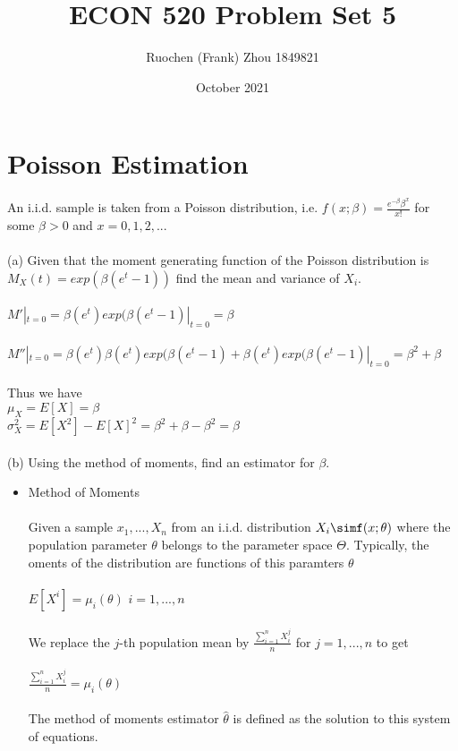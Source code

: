 \documentclass{article}
\title{ECON 520 Problem Set 5}
\author{Ruochen (Frank) Zhou 1849821}
\date{October 2021}
\begin{document}
\maketitle

\section{Poisson Estimation}
An i.i.d. sample is taken from a Poisson distribution, i.e. $f(x;\beta)=\frac{e^{-\beta}\beta^x}{x!}$ for some $\beta>0$ and $x=0,1,2,...$\\\\
(a)  Given that the moment generating function of the Poisson distribution is $M_X(t)=exp(\beta(e^t-1))$ find the mean and variance of $X_i$.\\\\
$M'|_{t=0}=\beta(e^t)exp(\beta(e^t-1)|_{t=0}=\beta$\\\\
$M''|_{t=0}=\beta(e^t)\beta(e^t)exp(\beta(e^t-1)+\beta(e^t)exp(\beta(e^t-1)|_{t=0}=\beta^2+\beta$\\\\
Thus we have\\
$\mu_X=E[X]=\beta$\\
$\sigma^2_X=E[X^2]-E[X]^2=\beta^2+\beta-\beta^2=\beta$\\\\
(b)  Using the method of moments, find an estimator for $\beta$.
\begin{itemize}
    \item Method of Moments\\\\
    Given a sample $x_1,...,X_n$ from an i.i.d. distribution $X_i\simf(x;\theta)$ where the population parameter $\theta$ belongs to the parameter space $\Theta$.  Typically, the oments of the distribution are functions of this paramters $\theta$\\\\
    $E[X^i]=\mu_i(\theta)$ $i=1,...,n$\\\\
    We replace the $j$-th population mean by $\frac{\sum_{i=1}^nX_i^j}{n}$ for $j=1,...,n$ to get \\\\
    $\frac{\sum_{i=1}^nX_i^j}{n}=\mu_i(\theta)$\\\\
    The method of moments estimator $\hat{\theta}$ is defined as the solution to this system of equations.
\end{itemize}
\end{document}
